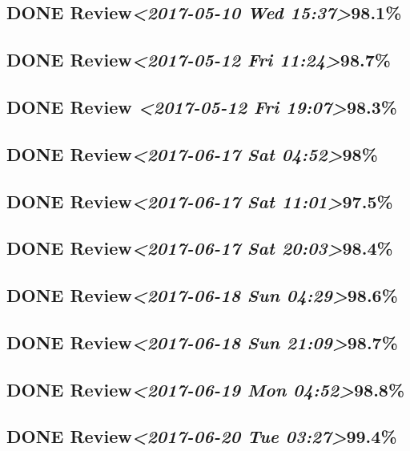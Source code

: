 \documentclass[11pt]{ctexart}
\begin{document}
\subsection{{\bfseries\sffamily DONE} Review\textit{<2017-05-10 Wed 15:37>}98.1\%}
\label{sec:org092d85b}
\subsection{{\bfseries\sffamily DONE} Review\textit{<2017-05-12 Fri 11:24>}98.7\%}
\label{sec:orgdc30a46}
\subsection{{\bfseries\sffamily DONE} Review \textit{<2017-05-12 Fri 19:07>}98.3\%}
\label{sec:org512ee4a}
\subsection{{\bfseries\sffamily DONE} Review\textit{<2017-06-17 Sat 04:52>}98\%}
\label{sec:org6b53d7c}
\subsection{{\bfseries\sffamily DONE} Review\textit{<2017-06-17 Sat 11:01>}97.5\%}
\label{sec:org9d0ecad}
\subsection{{\bfseries\sffamily DONE} Review\textit{<2017-06-17 Sat 20:03>}98.4\%}
\label{sec:org25e985f}
\subsection{{\bfseries\sffamily DONE} Review\textit{<2017-06-18 Sun 04:29>}98.6\%}
\label{sec:orgd2c72ba}
\subsection{{\bfseries\sffamily DONE} Review\textit{<2017-06-18 Sun 21:09>}98.7\%}
\label{sec:org82f0b3c}
\subsection{{\bfseries\sffamily DONE} Review\textit{<2017-06-19 Mon 04:52>}98.8\%}
\label{sec:orge8917d2}
\subsection{{\bfseries\sffamily DONE} Review\textit{<2017-06-20 Tue 03:27>}99.4\%}
\label{sec:orgbdf7b00}
\end{document}
